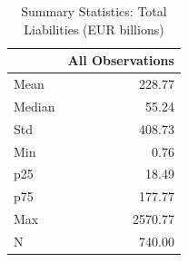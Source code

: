 \begin{table}
\caption{Summary Statistics: Total Liabilities (EUR billions)}
\label{tab:liability_summary}
\begin{tabular}{lr}
\toprule
 & All Observations \\
\midrule
Mean & 228.77 \\
Median & 55.24 \\
Std & 408.73 \\
Min & 0.76 \\
p25 & 18.49 \\
p75 & 177.77 \\
Max & 2570.77 \\
N & 740.00 \\
\bottomrule
\end{tabular}
\end{table}
